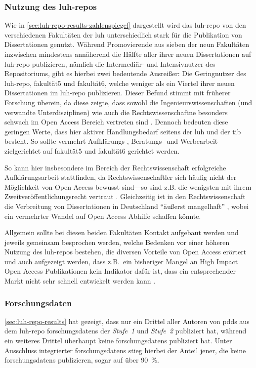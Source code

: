 \subsubsection{Nutzung des \gls{luh-repo}s}
Wie in \cref{sec:luh-repo-results-zahlenspiegel} dargestellt wird das \gls{luh-repo} von den verschiedenen Fakultäten der \gls{luh} unterschiedlich stark für die Publikation von Dissertationen genutzt.
Während Promovierende aus sieben der neun Fakultäten inzwischen mindestens annäherend die Hälfte aller ihrer neuen Dissertationen auf \gls{luh-repo} publizieren, nämlich die Intermediär- und Intensivnutzer des Repositoriums, gibt es hierbei zwei bedeutende Ausreißer:
Die Geringnutzer des \gls{luh-repo}, \gls{fakultät5} und \gls{fakultät6}, welche weniger als ein Viertel ihrer neuen Dissertationen im \gls{luh-repo} publizieren.
Dieser Befund stimmt mit früherer Forschung überein, da diese zeigte, dass sowohl die Ingenieurswissenschaften (und verwandte Unterdisziplinen) wie auch die Rechtswissenschaftne besonders schwach im Open Access Bereich vertreten sind \autocite{Archambault2014,Piwowar2018,Severin2020-Jura,Hamann2019-OA,Fischer2022-Jura}.
Dennoch bedeuten diese geringen Werte, dass hier aktiver Handlungsbedarf seitens der \gls{luh} und der \gls{tib} besteht.
So sollte vermehrt Aufklärungs-, Beratungs- und Werbearbeit zielgerichtet auf \gls{fakultät5} und \gls{fakultät6} gerichtet werden.

So kann hier insbesondere im Bereich der Rechtswissenschaft erfolgreiche Aufklärungsarbeit stattfinden, da Rechtswissenschaftler sich häufig nicht der Möglichkeit von Open Access bewusst sind---so sind z.B. die wenigsten mit ihrem Zweitveröffentlichungsrecht vertraut \autocite[91]{Eisentraut}.
Gleichzeitig ist in den Rechtswissenschaft die Verbreitung von Dissertationen in Deutschland \enquote{äußerst mangelhaft} \autocite[50]{Steinhauer2019-OA}, wobei ein vermehrter Wandel auf Open Access Abhilfe schaffen könnte.

Allgemein sollte bei diesen beiden Fakultäten Kontakt aufgebaut werden und jeweils gemeinsam besprochen werden, welche Bedenken vor einer höheren Nutzung des \gls{luh-repo}s bestehen, die diversen Vorteile von Open Access erörtert \autocite{Bautista-Puig2020} und auch aufgezeigt werden, dass z.B.~ein bisheriger Mangel an High Impact Open Access Publikationen kein Indikator dafür ist, dass ein entsprechender Markt nicht sehr schnell entwickelt werden kann \autocite{Björk2012}.

\subsubsection{Forschungsdaten}
\cref{sec:luh-repo-results} hat gezeigt, dass nur ein Drittel aller Autoren von \glspl{pdd} aus dem \gls{luh-repo} \glspl{forschungsdaten} der \textit{Stufe~1} und \textit{Stufe~2} publiziert hat, während ein weiteres Drittel überhaupt keine \glspl{forschungsdaten} publiziert hat.
Unter Ausschluss integrierter \glspl{forschungsdaten} stieg hierbei der Anteil jener, die keine \glspl{forschungsdaten} publizieren, sogar auf über \SI{90}{\percent}.

